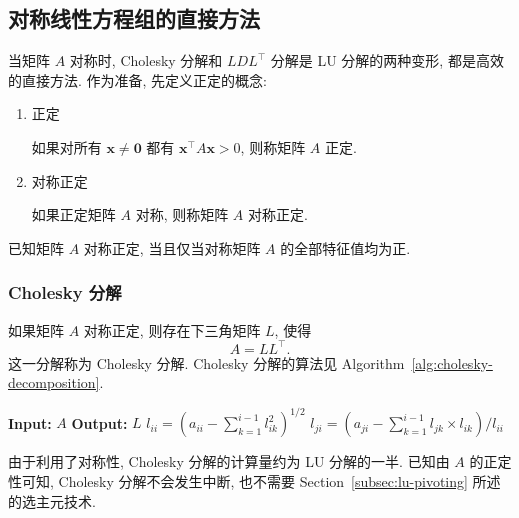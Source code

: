 \subsection{{对称线性方程组的直接方法}}\label{sec:symmetric-direct-methods}
{当矩阵 $A$ 对称时, Cholesky 分解和 $LDL^\top$ 分解是 LU 分解的两种变形, 都是高效的直接方法. 作为准备, 先定义正定的概念:}
\begin{enumerate}
\item {正定}
\par{如果对所有 $\bm x\ne\bm0$ 都有 $\bm x^\top A\bm x>0$, 则称矩阵 $A$ 正定.}
\item {对称正定}
\par{如果正定矩阵 $A$ 对称, 则称矩阵 $A$ 对称正定.}
\end{enumerate}
{已知矩阵 $A$ 对称正定, 当且仅当对称矩阵 $A$ 的全部特征值均为正.}
\subsubsection{{Cholesky 分解}}\label{subsec:cholesky-decomposition}
{如果矩阵 $A$ 对称正定, 则存在下三角矩阵 $L$, 使得}
\[A=LL^\top.\]
{这一分解称为 Cholesky 分解. Cholesky 分解的算法见 Algorithm~\ref{alg:cholesky-decomposition}.}
\begin{algorithm}[H]
\caption{{Cholesky 分解}}\label{alg:cholesky-decomposition}
\begin{algorithmic}[1]
\Statex\textbf{Input:} $A$
\Statex\textbf{Output:} $L$
\State $l_{ii}=(a_{ii}-\sum_{k=1}^{i-1}l_{ik}^2)^{1/2}$
\State $l_{ji}=(a_{ji}-\sum_{k=1}^{i-1}l_{jk}\times l_{ik})/l_{ii}$
\EndFor
\EndFor
\end{algorithmic}
\end{algorithm}
{由于利用了对称性, Cholesky 分解的计算量约为 LU 分解的一半.}
{已知由 $A$ 的正定性可知, Cholesky 分解不会发生中断, 也不需要 Section~\ref{subsec:lu-pivoting} 所述的选主元技术.}
